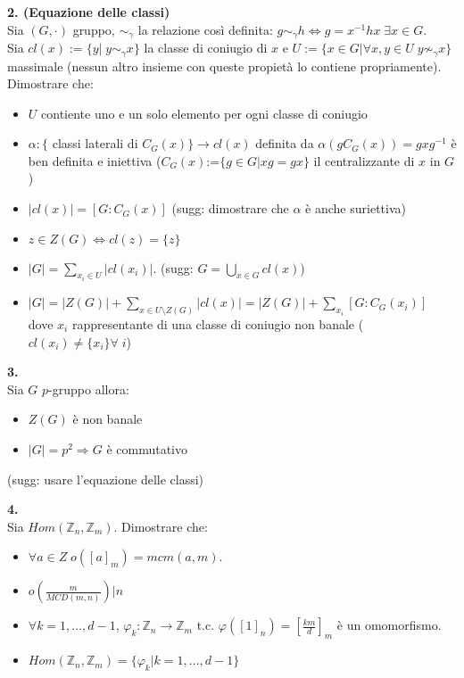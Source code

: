 \documentclass[italian,a4paper,11pt]
{article}
\newcommand{\Z}{\mathbb Z}
\newcommand{\acc}{\`}
\begin{document}
\vspace{0.1cm}
\noindent
\begin{Ex}\textbf{ 2. (Equazione delle classi)}\\
Sia $(G,\cdot )$ gruppo, $\sim_\gamma$ la relazione cos\acc i definita:
$g \sim _\gamma h \Leftrightarrow g=x^{-1}hx\;\exists x \in G$.\\
Sia $cl(x):=\{y |\; y\sim_\gamma x\}$ la classe di coniugio di $x$ e $U:=\{ x\in G | \forall x,y\in U \; y\not\sim_\gamma x\}$ massimale (nessun altro insieme con queste propiet\acc a lo contiene propriamente). Dimostrare che:
\begin{itemize}
\item $U$ contiente uno e un solo elemento per ogni classe di coniugio
\item $\alpha: \{$ classi laterali di $C_G(x)\} \rightarrow cl(x) $ definita da $\alpha (gC_G(x))=gxg^{-1} $ \acc e ben definita e iniettiva ($C_G(x)$:=$\{ g\in G | xg=gx \}$ il centralizzante di $x$ in $G$)
\item $|cl(x)|=[G:C_G(x)]$ (sugg: dimostrare che $\alpha$ \acc e anche suriettiva)
\item $z\in Z(G) \Leftrightarrow cl(z)=\{ z\}$
\item $|G|=\sum_{x_i \in U} |cl(x_i)|$.  (sugg: $G=\bigcup_{x\in G} cl(x)$)
\item $|G|=|Z(G)|+\sum_{x \in U\setminus Z(G)} |cl(x)|=|Z(G)|+\sum_{x_i} [G:C_G(x_i)]$ \\dove $x_i$ rappresentante di una classe di coniugio non banale ($cl(x_i)\neq \{ x_i\}\forall \;i$)
\end{itemize}
\end{Ex}

\vspace{0.1cm}
\noindent
\begin{Ex}\textbf{ 3.}\\
Sia $G$ $p$-gruppo allora:
\begin{itemize}
\item $Z(G)$ \acc e non banale
\item $|G|=p^2 \Rightarrow G$ \acc e commutativo
\end{itemize}
(sugg: usare l'equazione delle classi)
\end{Ex}
\newpage
\vspace{0.1cm}
\noindent
\begin{Ex}\textbf{ 4.}\\
Sia $Hom(\Z_n,\Z_m)$. Dimostrare che:
\begin{itemize}
\item $\forall a\in Z \; o([a]_m)=mcm(a,m)$.
\item $o(\frac{m}{MCD(m,n)})|n$
\item $\forall k= 1, \dots ,d-1$, $ \varphi_k: \Z_n \rightarrow \Z_m $ t.c. $\varphi([1]_n)=[\frac{km} d]_m $ \acc e un omomorfismo.
\item $Hom(\Z_n,\Z_m)=\{\varphi_k |k = 1,\dots ,d-1\}$
\end{itemize}
\end{Ex}
\end{document}
